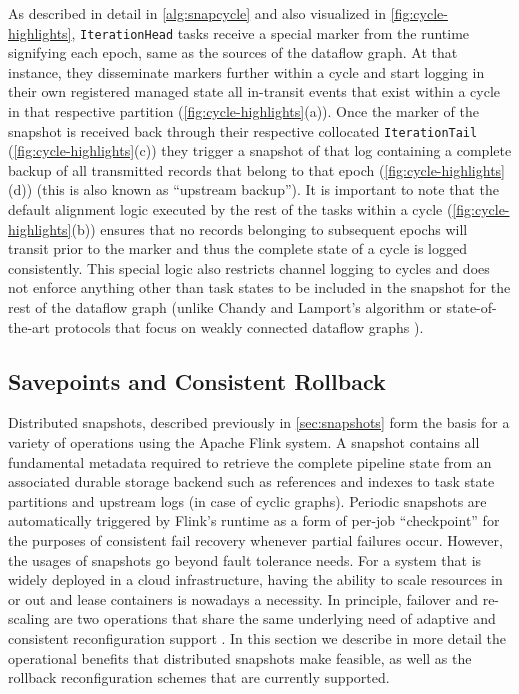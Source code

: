 As described in detail in \autoref{alg:snapcycle} and also visualized in \autoref{fig:cycle-highlights}, \texttt{IterationHead} tasks receive a special marker from the runtime signifying each epoch, same as the sources of the dataflow graph. At that instance, they disseminate markers further within a cycle and start logging in their own registered managed state all in-transit events that exist within a cycle in that respective partition (\autoref{fig:cycle-highlights}(a)). Once the marker of the snapshot is received back through their respective collocated \texttt{IterationTail} (\autoref{fig:cycle-highlights}(c)) they trigger a snapshot of that log containing a complete backup of all transmitted records that belong to that epoch (\autoref{fig:cycle-highlights}(d)) (this is also known as ``upstream backup''). It is important to note that the default alignment logic executed by the rest of the tasks within a cycle (\autoref{fig:cycle-highlights}(b)) ensures that no records belonging to subsequent epochs will transit prior to the marker and thus the complete state of a cycle is logged consistently. This special logic also restricts channel logging to cycles and does not enforce anything other than task states to be included in the snapshot for the rest of the dataflow graph (unlike Chandy and Lamport's \cite{chandy1985distributed} algorithm or state-of-the-art protocols that focus on weakly connected dataflow graphs \cite{elnozahy2002survey,jacques2016consistent,murray2013naiad}).


\subsection{Savepoints and Consistent Rollback}

Distributed snapshots, described previously in \autoref{sec:snapshots} form the basis for a variety of operations using the Apache Flink system. A snapshot contains all fundamental metadata required to retrieve the complete pipeline state from an associated durable storage backend such as references and indexes to task state partitions and upstream logs (in case of cyclic graphs). Periodic snapshots are automatically triggered by Flink's runtime as a form of per-job ``checkpoint'' for the purposes of consistent fail recovery whenever partial failures occur. However, the usages of snapshots go beyond fault tolerance needs. For a system that is widely deployed in a cloud infrastructure, having the ability to scale resources in or out and lease containers is nowadays a necessity. In principle, failover and re-scaling are two operations that share the same underlying need of adaptive and consistent reconfiguration support \cite{castro2013integrating}. In this section we describe in more detail the operational benefits that distributed snapshots make feasible, as well as the rollback reconfiguration schemes that are currently supported.

